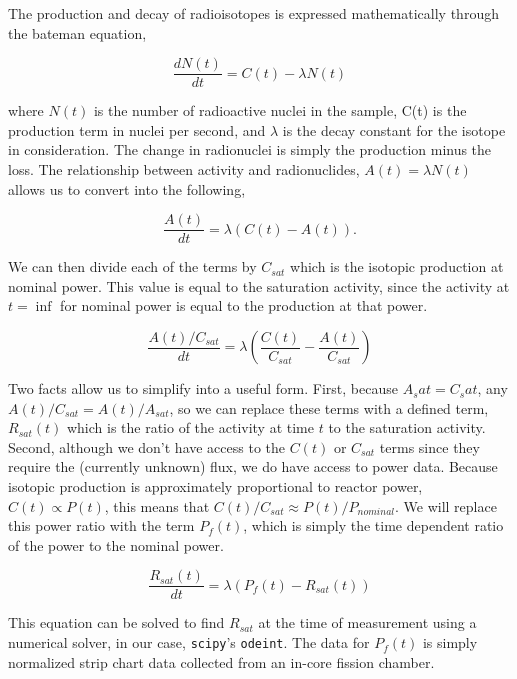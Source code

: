 The production and decay of radioisotopes is expressed mathematically through the bateman equation,

\begin{equation}
\label{eqn:bateman}
\frac{dN(t)}{dt} = C(t) - \lambda N(t)
\end{equation}

where $N(t)$ is the number of radioactive nuclei in the sample, C(t) is the production term in nuclei per second, and $\lambda$ is the decay constant for the isotope in consideration.
The change in radionuclei is simply the production minus the loss.
The relationship between activity and radionuclides, $A(t) = \lambda N(t)$ allows us to convert  into the following,

\begin{equation}
\label{eqn:bateman_activity}
\frac{A(t)}{dt} = \lambda (C(t) - A(t)).
\end{equation}

We can then divide each of the terms by $C_{sat}$ which is the isotopic production at nominal power.
This value is equal to the saturation activity, since the activity at $t = \inf$ for nominal power is equal to the production at that power.

\begin{equation}
\label{eqn:bateman_ratios}
\frac{A(t) / C_{sat}}{dt} = \lambda (\frac{C(t)}{C_{sat}} - \frac{A(t)}{C_{sat}})
\end{equation}

Two facts allow us to simplify  into a useful form.
First, because $A_sat = C_sat$, any $A(t) / C_{sat} = A(t) / A_{sat}$, so we can replace these terms with a defined term, $R_{sat}(t)$ which is the ratio of the activity at time $t$ to the saturation activity.
Second, although we don't have access to the $C(t)$ or $C_{sat}$ terms since they require the (currently unknown) flux, we do have access to power data.
Because isotopic production is approximately proportional to reactor power, $C(t) \propto P(t)$, this means that $C(t) / C_{sat} \approx P(t) / P_{nominal}$.
We will replace this power ratio with the term $P_{f}(t)$, which is simply the time dependent ratio of the power to the nominal power.

\begin{equation}
\label{eqn:bateman_r_sat}
\frac{R_{sat}(t)}{dt} = \lambda (P_{f}(t) - R_{sat}(t))
\end{equation}

This equation can be solved to find $R_{sat}$ at the time of measurement using a numerical solver, in our case, {\tt scipy}'s {\tt odeint}.
The data for $P_{f}(t)$ is simply normalized strip chart data collected from an in-core fission chamber.


